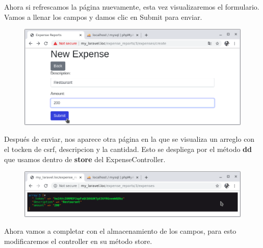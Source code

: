 \documentclass{article}
\begin{document}
Ahora si refrescamos la página nuevamente, esta vez visualizaremos el
formulario. Vamos a llenar los campos y damos clic en Submit para enviar.

\begin{figure}[h!]
  \centering
  \includegraphics[scale=0.5]{./Pictures/115_new_expense.png}
\end{figure}

Después de enviar, nos aparece otra página en la que se visualiza un arreglo
con el tocken de csrf, descripcion y la cantidad. Esto se despliega por el
método \textbf{dd} que usamos dentro de \textbf{store} del ExpenseController.\\

\begin{figure}[h!]
  \centering
  \includegraphics[scale=0.5]{./Pictures/116_dd_store.png}
\end{figure}

Ahora vamos a completar con el almacenamiento de los campos, para esto
modificaremos el controller en su método store.\\
\end{document}

